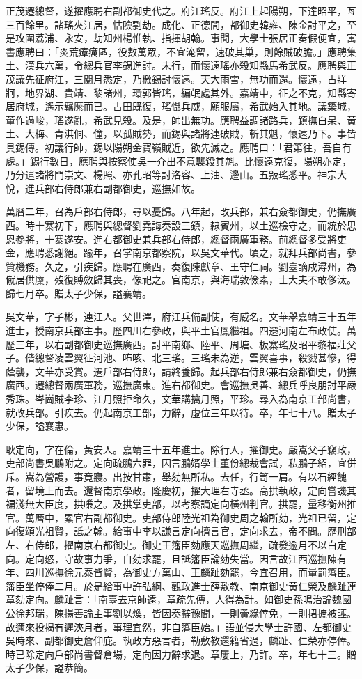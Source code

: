 \begin{pinyinscope}
正茂遷總督，遂擢應聘右副都御史代之。府江瑤反。府江上起陽朔，下達昭平，亙三百餘里。諸瑤夾江居，怙險剽劫。成化、正德間，都御史韓雍、陳金討平之，至是攻圍荔浦、永安，劫知州楊惟執、指揮胡翰。事聞，大學士張居正奏假便宜，寓書應聘曰：「炎荒瘴癘區，役數萬眾，不宜淹留，速破其巢，則餘賊破膽。」應聘集土、漢兵六萬，令總兵官李錫進討。未行，而懷遠瑤亦殺知縣馬希武反。應聘與正茂議先征府江，三閱月悉定，乃檄錫討懷遠。天大雨雪，無功而還。懷遠，古牂牁，地界湖、貴靖、黎諸州，環郭皆瑤，編氓處其外。嘉靖中，征之不克，知縣寄居府城，遙示羈縻而已。古田既復，瑤懾兵威，願服屬，希武始入其地。議築城，董作過峻，瑤遂亂，希武見殺。及是，師出無功。應聘益調諸路兵，鎮撫白杲、黃土、大梅、青淇侗、僮，以孤賊勢，而錫與諸將連破賊，斬其魁，懷遠乃下。事皆具錫傳。初議行師，錫以陽朔金寶嶺賊近，欲先滅之。應聘曰：「君第往，吾自有處。」錫行數日，應聘與按察使吳一介出不意襲殺其魁。比懷遠克復，陽朔亦定，乃分遣諸將門崇文、楊照、亦孔昭等討洛容、上油、邊山。五叛瑤悉平。神宗大悅，進兵部右侍郎兼右副都御史，巡撫如故。

萬曆二年，召為戶部右侍郎，尋以憂歸。八年起，改兵部，兼右僉都御史，仍撫廣西。時十寨初下，應聘與總督劉堯誨奏設三鎮，隸賓州，以土巡檢守之，而統於思恩參將，十寨遂安。進右都御史兼兵部右侍郎，總督兩廣軍務。前總督多受將吏金，應聘悉謝絕。踰年，召掌南京都察院，以吳文華代。頃之，就拜兵部尚書，參贊機務。久之，引疾歸。應聘在廣西，奏復陳獻章、王守仁祠。劉臺謫戍潯州，為僦居供廩，歿復賻斂歸其喪，像祀之。官南京，與海瑞敦儉素，士大夫不敢侈汰。歸七月卒。贈太子少保，謚襄靖。

吳文華，字子彬，連江人。父世澤，府江兵備副使，有威名。文華舉嘉靖三十五年進士，授南京兵部主事。歷四川右參政，與平土官鳳繼祖。四遷河南左布政使。萬歷三年，以右副都御史巡撫廣西。討平南鄉、陸平、周塘、板寨瑤及昭平黎福莊父子。偕總督凌雲翼征河池、咘咳、北三瑤。三瑤未為逆，雲翼喜事，殺戮甚慘，得蔭襲，文華亦受賞。遷戶部右侍郎，請終養歸。起兵部右侍郎兼右僉都御史，仍撫廣西。遷總督兩廣軍務，巡撫廣東。進右都御史。會巡撫吳善、總兵呼良朋討平嚴秀珠。岑崗賊李珍、江月照拒命久，文華購擒月照，平珍。尋入為南京工部尚書，就改兵部。引疾去。仍起南京工部，力辭，虛位三年以待。卒，年七十八。贈太子少保，謚襄惠。

耿定向，字在倫，黃安人。嘉靖三十五年進士。除行人，擢御史。嚴嵩父子竊政，吏部尚書吳鵬附之。定向疏鵬六罪，因言鵬婿學士董份總裁會試，私鵬子紹，宜併斥。嵩為營護，事竟寢。出按甘肅，舉劾無所私。去任，行笥一肩。有以石經餽者，留境上而去。還督南京學政。隆慶初，擢大理右寺丞。高拱執政，定向嘗譏其褊淺無大臣度，拱嗛之。及拱掌吏部，以考察謫定向橫州判官。拱罷，量移衡州推官。萬曆中，累官右副都御史。吏部侍郎陸光祖為御史周之翰所劾，光祖已留，定向復頌光祖賢，詆之翰。給事中李以謙言定向擠言官，定向求去，帝不問。歷刑部左、右侍郎，擢南京右都御史。御史王籓臣劾應天巡撫周繼，疏發逾月不以白定向。定向怒，守故事力爭，自劾求罷，且詆籓臣論劾失當。因言故江西巡撫陳有年、四川巡撫徐元泰皆賢，為御史方萬山、王麟趾劾罷，今宜召用，而量罰籓臣。籓臣坐停俸二月。於是給事中許弘綱、觀政進士薛敷教、南京御史黃仁榮及麟趾連章劾定向。麟趾言：「南臺去京師遠，章疏先傳，人得為計。如御史孫鳴治論魏國公徐邦瑞，陳揚善論主事劉以煥，皆因奏辭豫聞，一則夤緣倖免，一則捃摭被誣。故邇來投揭有遲浹月者，事理宜然，非自籓臣始。」語並侵大學士許國、左都御史吳時來、副都御史詹仰庇。執政方惡言者，勒敷教還籍省過，麟趾、仁榮亦停俸。時已除定向戶部尚書督倉場，定向因力辭求退。章屢上，乃許。卒，年七十三。贈太子少保，謚恭簡。


\end{pinyinscope}
